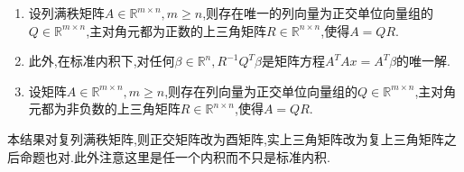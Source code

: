 \documentclass[../../main.tex]{subfiles}
\begin{document}
\begin{theorem}\label{theorem:施密特正交化对应的矩阵分解,QR分解}
\begin{enumerate}
\item 设列满秩矩阵\( A \in \mathbb{R}^{m \times n}, m \geqslant  n \),则存在唯一的列向量为正交单位向量组的\( Q \in \mathbb{R}^{m \times n} \),主对角元都为正数的上三角矩阵\( R \in \mathbb{R}^{n \times n} \),使得\( A = QR \).

\item 此外,在标准内积下,对任何\( \beta \in \mathbb{R}^n, R^{-1} Q^T \beta \)是矩阵方程\( A^T A x = A^T \beta \)的唯一解.

\item 设矩阵\( A \in \mathbb{R}^{m \times n}, m \geqslant  n \),则存在列向量为正交单位向量组的\( Q \in \mathbb{R}^{m \times n} \),主对角元都为非负数的上三角矩阵\( R \in \mathbb{R}^{n \times n} \),使得\( A = QR \).
\end{enumerate}
\end{theorem}
\begin{note}
本结果对复列满秩矩阵,则正交矩阵改为酉矩阵,实上三角矩阵改为复上三角矩阵之后命题也对.此外注意这里是任一个内积而不只是标准内积.
\end{note}
\end{document}
